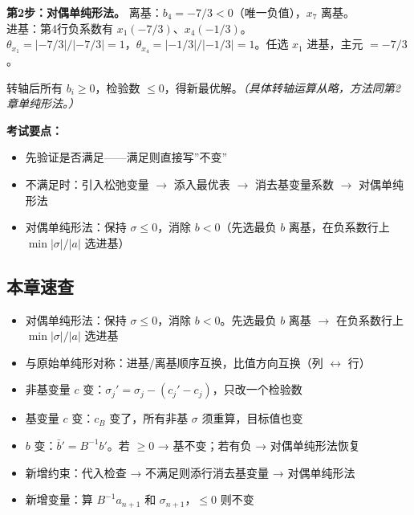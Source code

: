 {\textbf{第2步：对偶单纯形法。}
离基：$b_4 = -7/3 < 0$（唯一负值），$x_7$ 离基。\\
进基：第4行负系数有 $x_1(-7/3)$、$x_4(-1/3)$。\\
$\theta_{x_1} = |-7/3|/|-7/3| = 1$，$\theta_{x_4} = |-1/3|/|-1/3| = 1$。任选 $x_1$ 进基，主元 $=-7/3$。

转轴后所有 $b_i \ge 0$，检验数 $\le 0$，得新最优解。\emph{（具体转轴运算从略，方法同第2章单纯形法。）}

\medskip
\textbf{考试要点：}
\begin{itemize}
  \item 先验证是否满足——满足则直接写”不变”
  \item 不满足时：引入松弛变量 $\to$ 添入最优表 $\to$ 消去基变量系数 $\to$ 对偶单纯形法
  \item 对偶单纯形法：保持 $\sigma \le 0$，消除 $b < 0$（先选最负 $b$ 离基，在负系数行上 $\min |\sigma|/|a|$ 选进基）
\end{itemize}
}%

\clearpage\subsection{本章速查}

\begin{itemize}
  \item 对偶单纯形法：保持 $\sigma \le 0$，消除 $b < 0$。先选最负 $b$ 离基 $\to$ 在负系数行上 $\min |\sigma|/|a|$ 选进基
  \item 与原始单纯形对称：进基/离基顺序互换，比值方向互换（列 $\leftrightarrow$ 行）
  \item 非基变量 $c$ 变：$\sigma_j' = \sigma_j - (c_j'-c_j)$，只改一个检验数
  \item 基变量 $c$ 变：$c_B$ 变了，所有非基 $\sigma$ 须重算，目标值也变
  \item $b$ 变：$\bar{b}' = B^{-1}b'$。若 $\ge 0$ → 基不变；若有负 → 对偶单纯形法恢复
  \item 新增约束：代入检查 → 不满足则添行消去基变量 → 对偶单纯形法
  \item 新增变量：算 $B^{-1}a_{n+1}$ 和 $\sigma_{n+1}$，$\le 0$ 则不变
\end{itemize}
